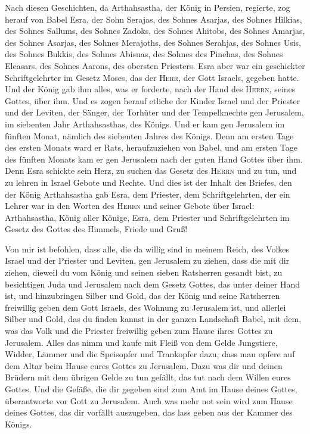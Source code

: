  Nach diesen Geschichten, da Arthahsastha, der König in
Persien, regierte, zog herauf von Babel Esra, der Sohn Serajas, des
Sohnes Asarjas, des Sohnes Hilkias,  des Sohnes Sallums,
des Sohnes Zadoks, des Sohnes Ahitobs,  des Sohnes
Amarjas, des Sohnes Asarjas, des Sohnes Merajoths,  des
Sohnes Serahjas, des Sohnes Usis, des Sohnes Bukkis,  des
Sohnes Abisuas, des Sohnes des Pinehas, des Sohnes Eleasars, des Sohnes
Aarons, des obersten Priesters.  Esra aber war ein
geschickter Schriftgelehrter im Gesetz Moses, das der \textsc{Herr}, der
Gott Israels, gegeben hatte. Und der König gab ihm alles, was er
forderte, nach der Hand des \textsc{Herrn}, seines Gottes, über ihm.
 Und es zogen herauf etliche der Kinder Israel und der
Priester und der Leviten, der Sänger, der Torhüter und der Tempelknechte
gen Jerusalem, im siebenten Jahr Arthahsasthas, des Königs.
 Und er kam gen Jerusalem im fünften Monat, nämlich des
siebenten Jahres des Königs.  Denn am ersten Tage des
ersten Monats ward er Rats, heraufzuziehen von Babel, und am ersten Tage
des fünften Monats kam er gen Jerusalem nach der guten Hand Gottes über
ihm.  Denn Esra schickte sein Herz, zu suchen das Gesetz
des \textsc{Herrn} und zu tun, und zu lehren in Israel Gebote und
Rechte.  Und dies ist der Inhalt des Briefes, den der
König Arthahsastha gab Esra, dem Priester, dem Schriftgelehrten, der ein
Lehrer war in den Worten des \textsc{Herrn} und seiner Gebote über
Israel:  Arthahsastha, König aller Könige, Esra, dem
Priester und Schriftgelehrten im Gesetz des Gottes des Himmels, Friede
und Gruß!

 Von mir ist befohlen, dass alle, die da willig sind in
meinem Reich, des Volkes Israel und der Priester und Leviten, gen
Jerusalem zu ziehen, dass die mit dir ziehen,  dieweil du
vom König und seinen sieben Ratsherren gesandt bist, zu besichtigen Juda
und Jerusalem nach dem Gesetz Gottes, das unter deiner Hand ist,
 und hinzubringen Silber und Gold, das der König und
seine Ratsherren freiwillig geben dem Gott Israels, des Wohnung zu
Jerusalem ist,  und allerlei Silber und Gold, das du
finden kannst in der ganzen Landschaft Babel, mit dem, was das Volk und
die Priester freiwillig geben zum Hause ihres Gottes zu Jerusalem.
 Alles das nimm und kaufe mit Fleiß von dem Gelde
Jungstiere, Widder, Lämmer und die Speisopfer und Trankopfer dazu, dass
man opfere auf dem Altar beim Hause eures Gottes zu Jerusalem.
 Dazu was dir und deinen Brüdern mit dem übrigen Gelde zu
tun gefällt, das tut nach dem Willen eures Gottes.  Und
die Gefäße, die dir gegeben sind zum Amt im Hause deines Gottes,
überantworte vor Gott zu Jerusalem.  Auch was mehr not
sein wird zum Hause deines Gottes, das dir vorfällt auszugeben, das lass
geben aus der Kammer des Königs.

